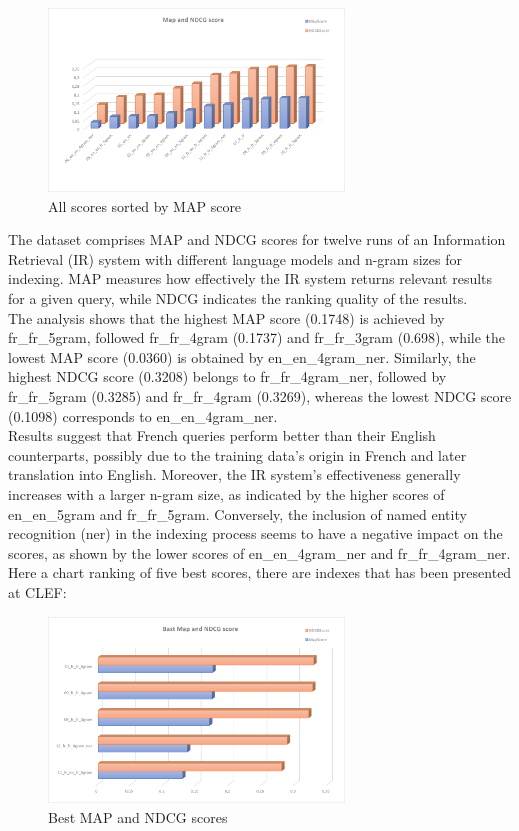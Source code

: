 \begin{figure}[h!]
	\centering
	\includegraphics[width=0.7\textwidth]{figure/allScoresSorted.png}
	\caption{All scores sorted by MAP score}
	\label{fig:sorted scores}
\end{figure}
The dataset comprises MAP and NDCG scores for twelve runs of an Information Retrieval (IR) system with different language models and n-gram sizes for indexing. MAP measures how effectively the IR system returns relevant results for a given query, while NDCG indicates the ranking quality of the results.\\
The analysis shows that the highest MAP score (0.1748) is achieved by fr\_fr\_5gram, followed fr\_fr\_4gram (0.1737) and fr\_fr\_3gram (0.698), while the lowest MAP score (0.0360) is obtained by en\_en\_4gram\_ner. Similarly, the highest NDCG score (0.3208) belongs to fr\_fr\_4gram\_ner, followed by fr\_fr\_5gram (0.3285) and fr\_fr\_4gram (0.3269), whereas the lowest NDCG score (0.1098) corresponds to en\_en\_4gram\_ner.\\
Results suggest that French queries perform better than their English counterparts, possibly due to the training data's origin in
French and later translation into English. Moreover, the IR system's effectiveness generally increases with a larger n-gram size, as indicated by the higher scores of en\_en\_5gram and fr\_fr\_5gram. Conversely, the inclusion of named entity recognition (ner) in the indexing process seems to have a negative impact on the scores, as shown by the lower scores of en\_en\_4gram\_ner and fr\_fr\_4gram\_ner.\\
Here a chart ranking of five best scores, there are indexes that has been presented at CLEF:
\begin{figure}[h!]
	\centering
	\includegraphics[width=0.7\textwidth]{figure/bestScores.png}
	\caption{Best MAP and NDCG scores}
	\label{fig:scores}
\end{figure}

